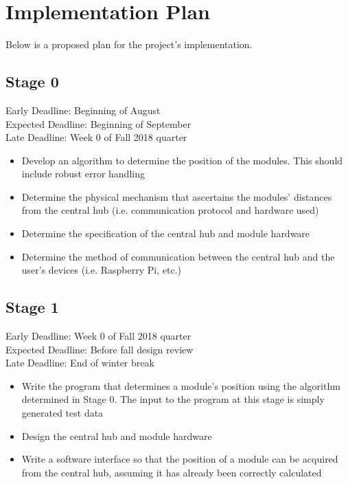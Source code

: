 \documentclass{article}
\begin{document}
\section{Implementation Plan}
Below is a proposed plan for the project's implementation.
\subsection{Stage 0}
Early Deadline: Beginning of August \\
Expected Deadline: Beginning of September \\
Late Deadline: Week 0 of Fall 2018 quarter \\
\begin{itemize}
\item Develop an algorithm to determine the position of the modules. This should include robust error handling
\item Determine the physical mechanism that ascertains the modules' distances from the central hub (i.e. communication protocol and hardware used)
\item Determine the specification of the central hub and module hardware
\item Determine the method of communication between the central hub and the user's devices (i.e. Raspberry Pi, etc.)
\end{itemize}

\subsection{Stage 1}
Early Deadline: Week 0 of Fall 2018 quarter \\
Expected Deadline: Before fall design review \\
Late Deadline: End of winter break \\
\begin{itemize}
\item Write the program that determines a module's position using the algorithm determined in Stage 0. The input to the program at this stage is simply generated test data
\item Design the central hub and module hardware
\item Write a software interface so that the position of a module can be acquired from the central hub, assuming it has already been correctly calculated
\end{itemize}
\end{document}
